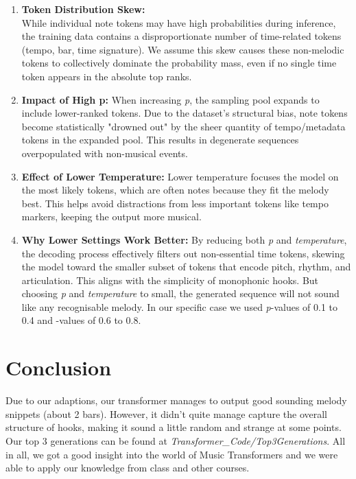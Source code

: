\documentclass[a4paper,12pt]{extarticle}
\begin{document}
\begin{enumerate}
    \item \textbf{Token Distribution Skew:}   \\
    While individual note tokens may have high probabilities during inference, the training data contains a disproportionate number of time-related tokens (tempo, bar, time signature).
    We assume this skew causes these non-melodic tokens to collectively dominate the probability mass, even if no single time token appears in the absolute top ranks.

    \item \textbf{Impact of High p:}  
    When increasing \textit{p}, the sampling pool expands to include lower-ranked tokens. Due to the dataset's structural bias,
    note tokens become statistically "drowned out" by the sheer quantity of tempo/metadata tokens in the expanded pool.
    This results in degenerate sequences overpopulated with non-musical events.

    \item \textbf{Effect of Lower Temperature:}  
    Lower temperature focuses the model on the most likely tokens, which are often notes because they fit the melody best. This helps avoid distractions from less important tokens like tempo markers, keeping the output more musical.

    \item \textbf{Why Lower Settings Work Better:}  
    By reducing both \textit{p} and \textit{temperature}, the decoding process effectively filters out non-essential time tokens, skewing the model toward the smaller subset of tokens that encode pitch, rhythm, and articulation.
    This aligns with the simplicity of monophonic hooks. But choosing \textit{p} and \textit{temperature} to small, the generated sequence will not sound like any recognisable melody.
    In our specific case we used \textit{p}-values of 0.1 to 0.4 and -values of 0.6 to 0.8.
\end{enumerate}

\section{Conclusion}

Due to our adaptions, our transformer manages to output good sounding melody snippets (about 2 bars).
However, it didn't quite manage capture the overall structure of hooks, making it sound a little random and strange at some points.
Our top 3 generations can be found at \textit{Transformer\_Code/Top3Generations}.
All in all, we got a good insight into the world of Music Transformers and we were able to apply our knowledge from class and other courses.

\newpage
\printbibliography
\end{document}
